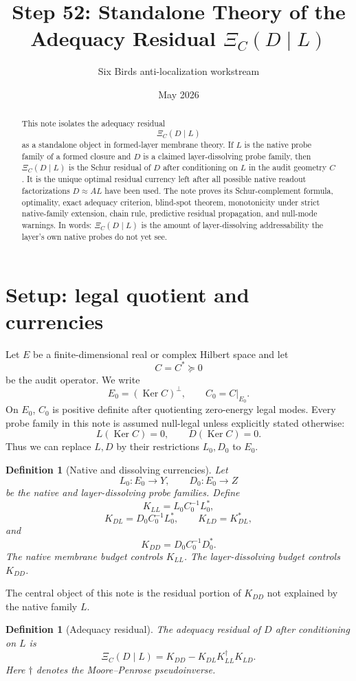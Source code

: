 \documentclass[11pt]{article}
\title{Step 52: Standalone Theory of the Adequacy Residual $\Xi_C(D\mid L)$}
\author{Six Birds anti-localization workstream}
\date{May 2026}
\newtheorem{definition}[theorem]{Definition}
\newcommand{\Ker}{\operatorname{Ker}}
\begin{document}
\maketitle

\begin{abstract}
This note isolates the adequacy residual
\[
\Xi_C(D\mid L)
\]
as a standalone object in formed-layer membrane theory.  If $L$ is the native probe family of a formed closure and $D$ is a claimed layer-dissolving probe family, then $\Xi_C(D\mid L)$ is the Schur residual of $D$ after conditioning on $L$ in the audit geometry $C$.  It is the unique optimal residual currency left after all possible native readout factorizations $D\approx AL$ have been used.  The note proves its Schur-complement formula, optimality, exact adequacy criterion, blind-spot theorem, monotonicity under strict native-family extension, chain rule, predictive residual propagation, and null-mode warnings.  In words: $\Xi_C(D\mid L)$ is the amount of layer-dissolving addressability the layer's own native probes do not yet see.
\end{abstract}

\section{Setup: legal quotient and currencies}

Let $E$ be a finite-dimensional real or complex Hilbert space and let
\[
C=C^*\succeq 0
\]
be the audit operator.  We write
\[
E_0=(\Ker C)^{\perp},\qquad C_0=C|_{E_0}.
\]
On $E_0$, $C_0$ is positive definite after quotienting zero-energy legal modes.  Every probe family in this note is assumed null-legal unless explicitly stated otherwise:
\[
L(\Ker C)=0,\qquad D(\Ker C)=0.
\]
Thus we can replace $L,D$ by their restrictions $L_0,D_0$ to $E_0$.

\begin{definition}[Native and dissolving currencies]
Let
\[
L_0:E_0\to Y,
\qquad
D_0:E_0\to Z
\]
be the native and layer-dissolving probe families.  Define
\[
K_{LL}=L_0 C_0^{-1}L_0^*,
\]
\[
K_{DL}=D_0 C_0^{-1}L_0^*,
\qquad
K_{LD}=K_{DL}^*,
\]
and
\[
K_{DD}=D_0 C_0^{-1}D_0^*.
\]
The native membrane budget controls $K_{LL}$.  The layer-dissolving budget controls $K_{DD}$.
\end{definition}

The central object of this note is the residual portion of $K_{DD}$ not explained by the native family $L$.

\begin{definition}[Adequacy residual]
The adequacy residual of $D$ after conditioning on $L$ is
\[
\boxed{
\Xi_C(D\mid L)
=
K_{DD}-K_{DL}K_{LL}^{\dagger}K_{LD}.
}
\]
Here $\dagger$ denotes the Moore--Penrose pseudoinverse.
\end{definition}
\end{document}
